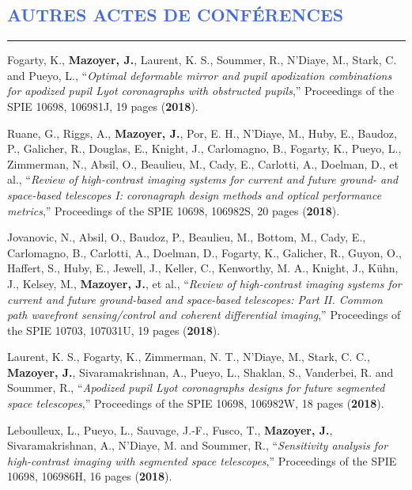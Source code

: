 \documentclass[11pt,a4paper, french]{article}
\begin{document}
\begin{etaremune}
\end{etaremune}


\vspace{-0.8cm}
\textcolor{RoyalBlue}{\section{\large AUTRES ACTES DE CONFÉRENCES}
\vspace{-0.2cm}\hrule}
\vspace{0.4cm}


\begin{etaremune}
\item Fogarty, K., \textbf{Mazoyer, J.}, Laurent, K. S., Soummer, R., N’Diaye, M., Stark, C. and Pueyo, L., “\textit{Optimal deformable mirror and pupil apodization combinations for apodized pupil Lyot coronagraphs with obstructed pupils},” Proceedings of the SPIE 10698, 106981J, 19 pages (\textbf{2018}).
\item Ruane, G., Riggs, A., \textbf{Mazoyer, J.}, Por, E. H., N’Diaye, M., Huby, E., Baudoz, P., Galicher, R., Douglas, E., Knight, J., Carlomagno, B., Fogarty, K., Pueyo, L., Zimmerman, N., Absil, O., Beaulieu, M., Cady, E., Carlotti, A., Doelman, D., et al., “\textit{Review of high-contrast imaging systems for current and future ground- and space-based telescopes I: coronagraph design methods and optical performance metrics},” Proceedings of the SPIE 10698, 106982S, 20 pages (\textbf{2018}).
\item Jovanovic, N., Absil, O., Baudoz, P., Beaulieu, M., Bottom, M., Cady, E., Carlomagno, B., Carlotti, A., Doelman, D., Fogarty, K., Galicher, R., Guyon, O., Haffert, S., Huby, E., Jewell, J., Keller, C., Kenworthy, M. A., Knight, J., Kühn, J., Kelsey, M., \textbf{Mazoyer, J.}, et al., “\textit{Review of high-contrast imaging systems for current and future ground-based and space-based telescopes: Part II. Common path wavefront sensing/control and coherent differential imaging},” Proceedings of the SPIE 10703, 107031U, 19 pages (\textbf{2018}).
\item Laurent, K. S., Fogarty, K., Zimmerman, N. T., N’Diaye, M., Stark, C. C., \textbf{Mazoyer, J.}, Sivaramakrishnan, A., Pueyo, L., Shaklan, S., Vanderbei, R. and Soummer, R., “\textit{Apodized pupil Lyot coronagraphs designs for future segmented space telescopes},” Proceedings of the SPIE 10698, 106982W, 18 pages (\textbf{2018}).
\item Leboulleux, L., Pueyo, L., Sauvage, J.-F., Fusco, T., \textbf{Mazoyer, J.}, Sivaramakrishnan, A., N’Diaye, M. and Soummer, R., “\textit{Sensitivity analysis for high-contrast imaging with segmented space telescopes},” Proceedings of the SPIE 10698, 106986H, 16 pages (\textbf{2018}).

\end{etaremune}
\end{document}

